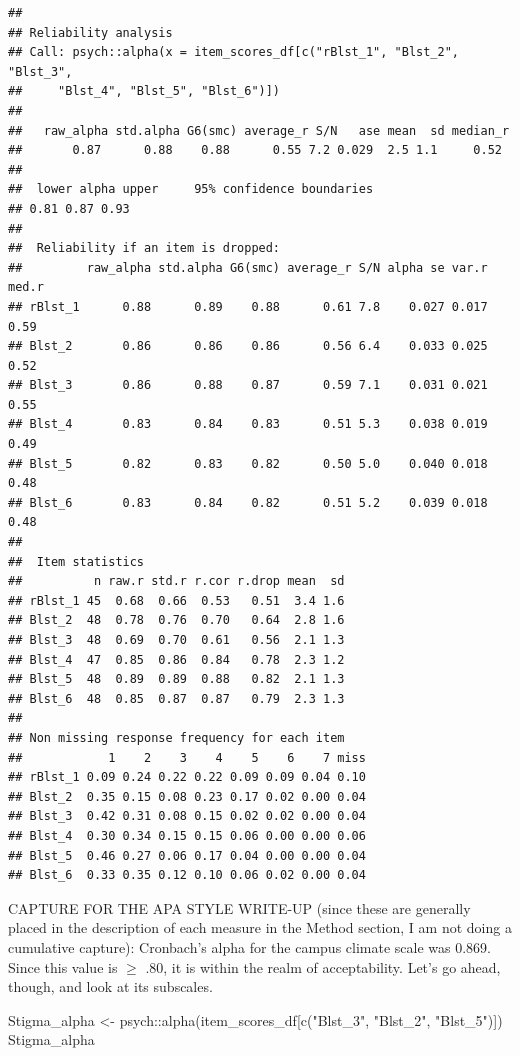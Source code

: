\documentclass[
  11pt,
]{book}
\newenvironment{Shaded}{\begin{snugshade}}{\end{snugshade}}
\newcommand{\FunctionTok}[1]{\textcolor[rgb]{0.00,0.00,0.00}{#1}}
\newcommand{\NormalTok}[1]{#1}
\newcommand{\OtherTok}[1]{\textcolor[rgb]{0.56,0.35,0.01}{#1}}
\newcommand{\SpecialCharTok}[1]{\textcolor[rgb]{0.00,0.00,0.00}{#1}}
\newcommand{\StringTok}[1]{\textcolor[rgb]{0.31,0.60,0.02}{#1}}
\begin{document}
\begin{verbatim}
## 
## Reliability analysis   
## Call: psych::alpha(x = item_scores_df[c("rBlst_1", "Blst_2", "Blst_3", 
##     "Blst_4", "Blst_5", "Blst_6")])
## 
##   raw_alpha std.alpha G6(smc) average_r S/N   ase mean  sd median_r
##       0.87      0.88    0.88      0.55 7.2 0.029  2.5 1.1     0.52
## 
##  lower alpha upper     95% confidence boundaries
## 0.81 0.87 0.93 
## 
##  Reliability if an item is dropped:
##         raw_alpha std.alpha G6(smc) average_r S/N alpha se var.r med.r
## rBlst_1      0.88      0.89    0.88      0.61 7.8    0.027 0.017  0.59
## Blst_2       0.86      0.86    0.86      0.56 6.4    0.033 0.025  0.52
## Blst_3       0.86      0.88    0.87      0.59 7.1    0.031 0.021  0.55
## Blst_4       0.83      0.84    0.83      0.51 5.3    0.038 0.019  0.49
## Blst_5       0.82      0.83    0.82      0.50 5.0    0.040 0.018  0.48
## Blst_6       0.83      0.84    0.82      0.51 5.2    0.039 0.018  0.48
## 
##  Item statistics 
##          n raw.r std.r r.cor r.drop mean  sd
## rBlst_1 45  0.68  0.66  0.53   0.51  3.4 1.6
## Blst_2  48  0.78  0.76  0.70   0.64  2.8 1.6
## Blst_3  48  0.69  0.70  0.61   0.56  2.1 1.3
## Blst_4  47  0.85  0.86  0.84   0.78  2.3 1.2
## Blst_5  48  0.89  0.89  0.88   0.82  2.1 1.3
## Blst_6  48  0.85  0.87  0.87   0.79  2.3 1.3
## 
## Non missing response frequency for each item
##            1    2    3    4    5    6    7 miss
## rBlst_1 0.09 0.24 0.22 0.22 0.09 0.09 0.04 0.10
## Blst_2  0.35 0.15 0.08 0.23 0.17 0.02 0.00 0.04
## Blst_3  0.42 0.31 0.08 0.15 0.02 0.02 0.00 0.04
## Blst_4  0.30 0.34 0.15 0.15 0.06 0.00 0.00 0.06
## Blst_5  0.46 0.27 0.06 0.17 0.04 0.00 0.00 0.04
## Blst_6  0.33 0.35 0.12 0.10 0.06 0.02 0.00 0.04
\end{verbatim}

CAPTURE FOR THE APA STYLE WRITE-UP (since these are generally placed in the description of each measure in the Method section, I am not doing a cumulative capture): Cronbach's alpha for the campus climate scale was 0.869. Since this value is \(\geq\) .80, it is within the realm of acceptability. Let's go ahead, though, and look at its subscales.

\begin{Shaded}
\begin{Highlighting}[]
\NormalTok{Stigma\_alpha }\OtherTok{\textless{}{-}}\NormalTok{ psych}\SpecialCharTok{::}\FunctionTok{alpha}\NormalTok{(item\_scores\_df[}\FunctionTok{c}\NormalTok{(}\StringTok{"Blst\_3"}\NormalTok{, }\StringTok{"Blst\_2"}\NormalTok{, }\StringTok{"Blst\_5"}\NormalTok{)])}
\NormalTok{Stigma\_alpha}
\end{Highlighting}
\end{Shaded}
\end{document}
